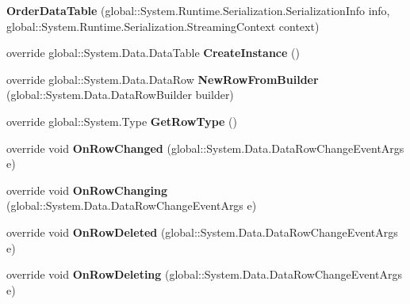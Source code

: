 \begin{DoxyCompactItemize}
\item 
{\bfseries Order\+Data\+Table} (global\+::\+System.\+Runtime.\+Serialization.\+Serialization\+Info info, global\+::\+System.\+Runtime.\+Serialization.\+Streaming\+Context context)\hypertarget{class_products_1_1_data_1_1ds_sage_1_1_order_data_table_a50f37cbfd957073b0646086257b7f7b5}{}\label{class_products_1_1_data_1_1ds_sage_1_1_order_data_table_a50f37cbfd957073b0646086257b7f7b5}

\item 
override global\+::\+System.\+Data.\+Data\+Table {\bfseries Create\+Instance} ()\hypertarget{class_products_1_1_data_1_1ds_sage_1_1_order_data_table_a9f1337d3bc8e39d393b48f3ce5716812}{}\label{class_products_1_1_data_1_1ds_sage_1_1_order_data_table_a9f1337d3bc8e39d393b48f3ce5716812}

\item 
override global\+::\+System.\+Data.\+Data\+Row {\bfseries New\+Row\+From\+Builder} (global\+::\+System.\+Data.\+Data\+Row\+Builder builder)\hypertarget{class_products_1_1_data_1_1ds_sage_1_1_order_data_table_a96683d53b6ae7eeab7ef310d077edf8a}{}\label{class_products_1_1_data_1_1ds_sage_1_1_order_data_table_a96683d53b6ae7eeab7ef310d077edf8a}

\item 
override global\+::\+System.\+Type {\bfseries Get\+Row\+Type} ()\hypertarget{class_products_1_1_data_1_1ds_sage_1_1_order_data_table_a14e2c162039c895b883180748f8f4978}{}\label{class_products_1_1_data_1_1ds_sage_1_1_order_data_table_a14e2c162039c895b883180748f8f4978}

\item 
override void {\bfseries On\+Row\+Changed} (global\+::\+System.\+Data.\+Data\+Row\+Change\+Event\+Args e)\hypertarget{class_products_1_1_data_1_1ds_sage_1_1_order_data_table_a61455a3cd24a5699c47fcf96904337e0}{}\label{class_products_1_1_data_1_1ds_sage_1_1_order_data_table_a61455a3cd24a5699c47fcf96904337e0}

\item 
override void {\bfseries On\+Row\+Changing} (global\+::\+System.\+Data.\+Data\+Row\+Change\+Event\+Args e)\hypertarget{class_products_1_1_data_1_1ds_sage_1_1_order_data_table_a023a8ddf7ecd4ace64da7433e9824b18}{}\label{class_products_1_1_data_1_1ds_sage_1_1_order_data_table_a023a8ddf7ecd4ace64da7433e9824b18}

\item 
override void {\bfseries On\+Row\+Deleted} (global\+::\+System.\+Data.\+Data\+Row\+Change\+Event\+Args e)\hypertarget{class_products_1_1_data_1_1ds_sage_1_1_order_data_table_a6686759636e0eb9e438ca316a1cc7380}{}\label{class_products_1_1_data_1_1ds_sage_1_1_order_data_table_a6686759636e0eb9e438ca316a1cc7380}

\item 
override void {\bfseries On\+Row\+Deleting} (global\+::\+System.\+Data.\+Data\+Row\+Change\+Event\+Args e)\hypertarget{class_products_1_1_data_1_1ds_sage_1_1_order_data_table_a4e858e4ba3158c48df55bc12b2568d7a}{}\label{class_products_1_1_data_1_1ds_sage_1_1_order_data_table_a4e858e4ba3158c48df55bc12b2568d7a}

\end{DoxyCompactItemize}
